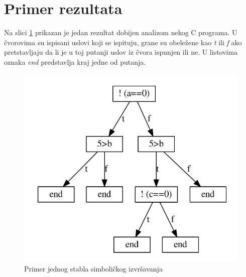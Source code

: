 \documentclass[a4paper]{article}
\begin{document}
\section{Primer rezultata}
Na slici \ref{fig:primer} prikazan je jedan rezultat dobijen analizom nekog C programa. U čvorovima su ispisani uslovi koji se ispituju, grane su obeležene kao \textit{t} ili \textit{f} ako pretstavljaju da li je u toj putanji uslov iz čvora ispunjen ili ne. U listovima oznaka \textit{end} predstavlja kraj jedne od putanja.

\begin{figure}[h!]
\begin{center}
\includegraphics[scale=0.6]{primer.jpg}
\end{center}
\caption{Primer jednog stabla simboličkog izvršavanja}
\label{fig:primer}
\end{figure}

\appendix
 

\end{document}
